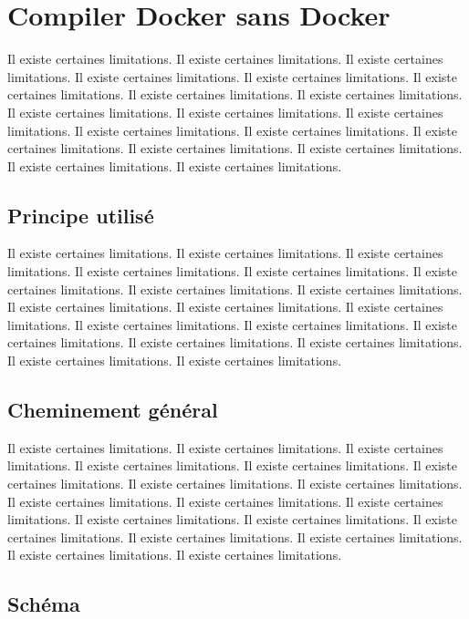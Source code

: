 \documentclass[11pt,a4paper,oneside]{report}
\begin{document}
\section{Compiler Docker sans Docker}

Il existe certaines limitations.
Il existe certaines limitations.
Il existe certaines limitations.
Il existe certaines limitations.
Il existe certaines limitations.
Il existe certaines limitations.
Il existe certaines limitations.
Il existe certaines limitations.
Il existe certaines limitations.
Il existe certaines limitations.
Il existe certaines limitations.
Il existe certaines limitations.
Il existe certaines limitations.
Il existe certaines limitations.
Il existe certaines limitations.
Il existe certaines limitations.
Il existe certaines limitations.
Il existe certaines limitations.
\subsection{Principe utilisé}

Il existe certaines limitations.
Il existe certaines limitations.
Il existe certaines limitations.
Il existe certaines limitations.
Il existe certaines limitations.
Il existe certaines limitations.
Il existe certaines limitations.
Il existe certaines limitations.
Il existe certaines limitations.
Il existe certaines limitations.
Il existe certaines limitations.
Il existe certaines limitations.
Il existe certaines limitations.
Il existe certaines limitations.
Il existe certaines limitations.
Il existe certaines limitations.
Il existe certaines limitations.
Il existe certaines limitations.
\subsection{Cheminement général}

Il existe certaines limitations.
Il existe certaines limitations.
Il existe certaines limitations.
Il existe certaines limitations.
Il existe certaines limitations.
Il existe certaines limitations.
Il existe certaines limitations.
Il existe certaines limitations.
Il existe certaines limitations.
Il existe certaines limitations.
Il existe certaines limitations.
Il existe certaines limitations.
Il existe certaines limitations.
Il existe certaines limitations.
Il existe certaines limitations.
Il existe certaines limitations.
Il existe certaines limitations.
Il existe certaines limitations.
\subsection{Schéma}
\end{document}
